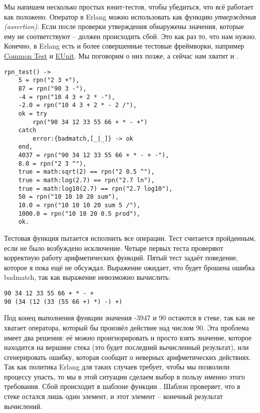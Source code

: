 Мы напишем несколько простых юнит\--тестов, чтобы убедиться, что всё работает как положено.
Оператор \ops{=\strut} в Erlang можно использовать как функцию \emph{утверждения (assertion)}.
Если после проверки утверждения обнаружены значения, которые ему не соответствуют \--- должен происходить сбой.
Это как раз то, что нам нужно.
Конечно, в Erlang есть и более совершенные тестовые фреймворки, например \href{http://erlang.org/doc/apps/common_test/write_test_chapter.html}{Common Test} и \href{http://erlang.org/doc/apps/eunit/chapter.html}{EUnit}.
Мы поговорим о них позже, а сейчас нам хватит и \ops{=\strut}.
\begin{lstlisting}[style=erlang]
rpn_test() ->
    5 = rpn("2 3 +"),
    87 = rpn("90 3 -"),
    -4 = rpn("10 4 3 + 2 * -"),
    -2.0 = rpn("10 4 3 + 2 * - 2 /"),
    ok = try
        rpn("90 34 12 33 55 66 + * - +")
    catch
        error:{badmatch,[_|_]} -> ok
    end,
    4037 = rpn("90 34 12 33 55 66 + * - + -"),
    8.0 = rpn("2 3 ^"),
    true = math:sqrt(2) == rpn("2 0.5 ^"),
    true = math:log(2.7) == rpn("2.7 ln"),
    true = math:log10(2.7) == rpn("2.7 log10"),
    50 = rpn("10 10 10 20 sum"),
    10.0 = rpn("10 10 10 20 sum 5 /"),
    1000.0 = rpn("10 10 20 0.5 prod"),
    ok.
\end{lstlisting}

Тестовая функция пытается исполнить все операции.
Тест считается пройденным, если не было возбуждено исключение.
Четыре первых теста проверяют корректную работу арифметических функций.
Пятый тест задаёт поведение, которое я пока ещё не обсуждал.
Выражение  ожидает, что будет брошена ошибка badmatch, так как выражение невозможно вычислить:
\begin{lstlisting}[style=erlang]
90 34 12 33 55 66 + * - +
90 (34 (12 (33 (55 66 +) *) -) +)
\end{lstlisting}

Под конец выполнения функции  значения -3947 и 90 остаются в стеке, так как не хватает оператора, который бы произвёл действие над числом 90.
Эта проблема имеет два решения: её можно проигнорировать и просто взять значение, которое находится на вершине стека (это будет последний вычисленный результат), или сгенерировать ошибку, которая сообщит о неверных арифметических действиях.
Так как политика Erlang для таких случаев требует, чтобы мы позволили процессу упасть, то мы в этой ситуации сделаем выбор в пользу именно этого требования.
Сбой происходит в шаблоне \ops{[Res]} функции .
Шаблон проверяет, что в стеке остался лишь один элемент, и этот элемент \--- конечный результат вычислений.

